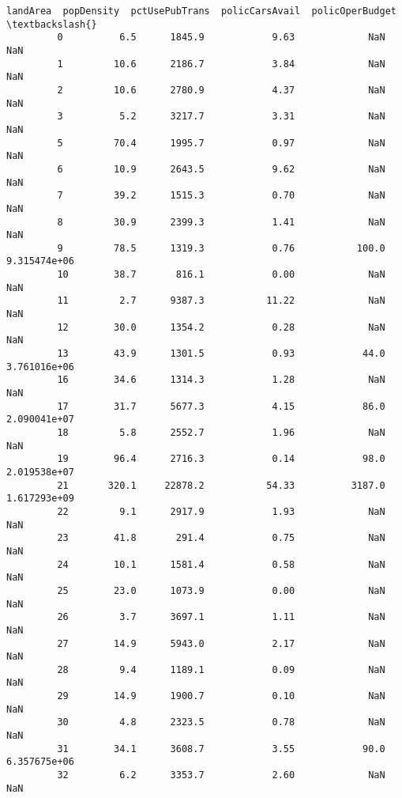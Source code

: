 \documentclass[11pt]{llncs}
\begin{document}
\begin{Verbatim}[commandchars=\\\{\}]
               landArea  popDensity  pctUsePubTrans  policCarsAvail  policOperBudget  \textbackslash{}
         0          6.5      1845.9            9.63             NaN              NaN   
         1         10.6      2186.7            3.84             NaN              NaN   
         2         10.6      2780.9            4.37             NaN              NaN   
         3          5.2      3217.7            3.31             NaN              NaN   
         5         70.4      1995.7            0.97             NaN              NaN   
         6         10.9      2643.5            9.62             NaN              NaN   
         7         39.2      1515.3            0.70             NaN              NaN   
         8         30.9      2399.3            1.41             NaN              NaN   
         9         78.5      1319.3            0.76           100.0     9.315474e+06   
         10        38.7       816.1            0.00             NaN              NaN   
         11         2.7      9387.3           11.22             NaN              NaN   
         12        30.0      1354.2            0.28             NaN              NaN   
         13        43.9      1301.5            0.93            44.0     3.761016e+06   
         16        34.6      1314.3            1.28             NaN              NaN   
         17        31.7      5677.3            4.15            86.0     2.090041e+07   
         18         5.8      2552.7            1.96             NaN              NaN   
         19        96.4      2716.3            0.14            98.0     2.019538e+07   
         21       320.1     22878.2           54.33          3187.0     1.617293e+09   
         22         9.1      2917.9            1.93             NaN              NaN   
         23        41.8       291.4            0.75             NaN              NaN   
         24        10.1      1581.4            0.58             NaN              NaN   
         25        23.0      1073.9            0.00             NaN              NaN   
         26         3.7      3697.1            1.11             NaN              NaN   
         27        14.9      5943.0            2.17             NaN              NaN   
         28         9.4      1189.1            0.09             NaN              NaN   
         29        14.9      1900.7            0.10             NaN              NaN   
         30         4.8      2323.5            0.78             NaN              NaN   
         31        34.1      3608.7            3.55            90.0     6.357675e+06   
         32         6.2      3353.7            2.60             NaN              NaN   

\end{Verbatim}
\end{document}
